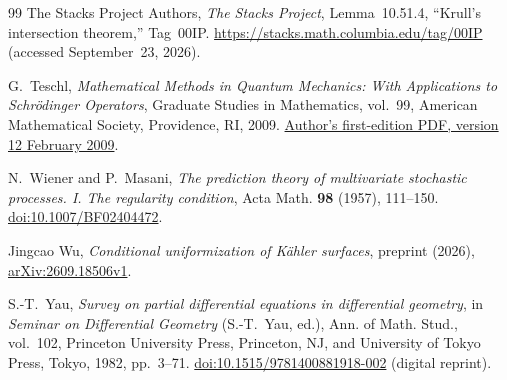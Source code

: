 \begin{thebibliography}{99}
The Stacks Project Authors,
\emph{The Stacks Project},
Lemma~10.51.4, ``Krull's intersection theorem,'' Tag~00IP.
\url{https://stacks.math.columbia.edu/tag/00IP}
(accessed September~23, 2026).

G.~Teschl,
\emph{Mathematical Methods in Quantum Mechanics:
With Applications to Schr\"odinger Operators},
Graduate Studies in Mathematics, vol.~99,
American Mathematical Society, Providence, RI, 2009.
\href{https://www.mat.univie.ac.at/~gerald/ftp/book-schroe/schroe.pdf}
{Author's first-edition PDF, version 12 February 2009}.

N.~Wiener and P.~Masani,
\emph{The prediction theory of multivariate stochastic processes.
I. The regularity condition},
Acta Math. \textbf{98} (1957), 111--150.
\href{https://doi.org/10.1007/BF02404472}{doi:10.1007/BF02404472}.

Jingcao Wu,
\emph{Conditional uniformization of K\"ahler surfaces},
preprint (2026),
\href{https://arxiv.org/abs/2609.18506v1}{arXiv:2609.18506v1}.

S.-T.~Yau,
\emph{Survey on partial differential equations in differential geometry},
in \emph{Seminar on Differential Geometry} (S.-T.~Yau, ed.),
Ann. of Math. Stud., vol.~102,
Princeton University Press, Princeton, NJ, and University of Tokyo Press,
Tokyo, 1982, pp.~3--71.
\href{https://doi.org/10.1515/9781400881918-002}
{doi:10.1515/9781400881918-002} (digital reprint).

\end{thebibliography}
